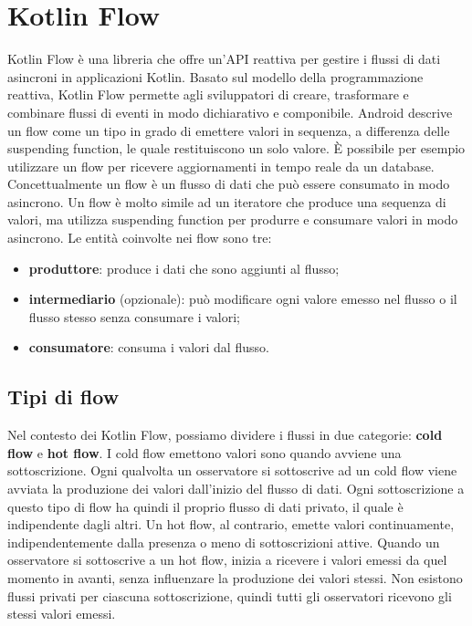 \documentclass[12pt,a4paper,openright,twoside]{book}
\begin{document}
\section{Kotlin Flow}
Kotlin Flow è una libreria che offre un'API reattiva per gestire i flussi di dati asincroni in applicazioni Kotlin. Basato sul modello della programmazione reattiva, Kotlin Flow permette agli sviluppatori di creare, trasformare e combinare flussi di eventi in modo dichiarativo e componibile.
Android descrive un flow come un tipo in grado di emettere valori in sequenza, a differenza delle suspending function, le quale restituiscono un solo valore. È possibile per esempio utilizzare un flow per ricevere aggiornamenti in tempo reale da un database. Concettualmente un flow è un flusso di dati che può essere consumato in modo asincrono. 
Un flow è molto simile ad un iteratore che produce una sequenza di valori, ma utilizza suspending function per produrre e consumare valori in modo asincrono. 
Le entità coinvolte nei flow sono tre: 
\begin{itemize}
    \item \textbf{produttore}: produce i dati che sono aggiunti al flusso; 
    \item \textbf{intermediario} (opzionale): può modificare ogni valore emesso nel flusso o il flusso stesso senza consumare i valori; 
    \item \textbf{consumatore}: consuma i valori dal flusso. 
\end{itemize}

\subsection{Tipi di flow}
Nel contesto dei Kotlin Flow, possiamo dividere i flussi in due categorie: \textbf{cold flow} e \textbf{hot flow}. 
I cold flow emettono valori sono quando avviene una sottoscrizione. Ogni qualvolta un osservatore si sottoscrive ad un cold flow viene avviata la produzione dei valori dall'inizio del flusso di dati. Ogni sottoscrizione a questo tipo di flow ha quindi il proprio flusso di dati privato, il quale è indipendente dagli altri. 
Un hot flow, al contrario, emette valori continuamente, indipendentemente dalla presenza o meno di sottoscrizioni attive. Quando un osservatore si sottoscrive a un hot flow, inizia a ricevere i valori emessi da quel momento in avanti, senza influenzare la produzione dei valori stessi. Non esistono flussi privati per ciascuna sottoscrizione, quindi tutti gli osservatori ricevono gli stessi valori emessi. 
\end{document}
